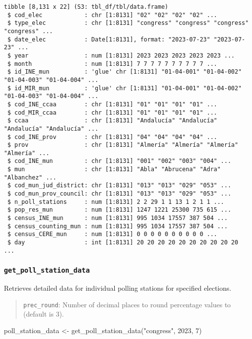 \documentclass[
  letterpaper,
  DIV=11,
  numbers=noendperiod]{scrreprt}
\newenvironment{Shaded}{\begin{snugshade}}{\end{snugshade}}
\newcommand{\DecValTok}[1]{\textcolor[rgb]{0.68,0.00,0.00}{#1}}
\newcommand{\FunctionTok}[1]{\textcolor[rgb]{0.28,0.35,0.67}{#1}}
\newcommand{\NormalTok}[1]{\textcolor[rgb]{0.00,0.23,0.31}{#1}}
\newcommand{\OtherTok}[1]{\textcolor[rgb]{0.00,0.23,0.31}{#1}}
\newcommand{\StringTok}[1]{\textcolor[rgb]{0.13,0.47,0.30}{#1}}
\begin{document}
\begin{verbatim}
tibble [8,131 x 22] (S3: tbl_df/tbl/data.frame)
 $ cod_elec            : chr [1:8131] "02" "02" "02" "02" ...
 $ type_elec           : chr [1:8131] "congress" "congress" "congress" "congress" ...
 $ date_elec           : Date[1:8131], format: "2023-07-23" "2023-07-23" ...
 $ year                : num [1:8131] 2023 2023 2023 2023 2023 ...
 $ month               : num [1:8131] 7 7 7 7 7 7 7 7 7 7 ...
 $ id_INE_mun          : 'glue' chr [1:8131] "01-04-001" "01-04-002" "01-04-003" "01-04-004" ...
 $ id_MIR_mun          : 'glue' chr [1:8131] "01-04-001" "01-04-002" "01-04-003" "01-04-004" ...
 $ cod_INE_ccaa        : chr [1:8131] "01" "01" "01" "01" ...
 $ cod_MIR_ccaa        : chr [1:8131] "01" "01" "01" "01" ...
 $ ccaa                : chr [1:8131] "Andalucía" "Andalucía" "Andalucía" "Andalucía" ...
 $ cod_INE_prov        : chr [1:8131] "04" "04" "04" "04" ...
 $ prov                : chr [1:8131] "Almería" "Almería" "Almería" "Almería" ...
 $ cod_INE_mun         : chr [1:8131] "001" "002" "003" "004" ...
 $ mun                 : chr [1:8131] "Abla" "Abrucena" "Adra" "Albanchez" ...
 $ cod_mun_jud_district: chr [1:8131] "013" "013" "029" "053" ...
 $ cod_mun_prov_council: chr [1:8131] "013" "013" "029" "053" ...
 $ n_poll_stations     : num [1:8131] 2 2 29 1 1 13 1 2 1 1 ...
 $ pop_res_mun         : num [1:8131] 1247 1221 25300 735 615 ...
 $ census_INE_mun      : num [1:8131] 995 1034 17557 387 504 ...
 $ census_counting_mun : num [1:8131] 995 1034 17557 387 504 ...
 $ census_CERE_mun     : num [1:8131] 0 0 0 0 0 0 0 0 0 0 ...
 $ day                 : int [1:8131] 20 20 20 20 20 20 20 20 20 20 ...
\end{verbatim}

\hypertarget{get_poll_station_data}{%
\subsubsection{\texorpdfstring{\texttt{get\_poll\_station\_data}}{get\_poll\_station\_data}}\label{get_poll_station_data}}

Retrieves detailed data for individual polling stations for specified
elections.

\begin{quote}
\texttt{prec\_round}: Number of decimal places to round percentage
values to (default is 3).
\end{quote}

\begin{Shaded}
\begin{Highlighting}[]
\NormalTok{poll\_station\_data }\OtherTok{\textless{}{-}} \FunctionTok{get\_poll\_station\_data}\NormalTok{(}\StringTok{"congress"}\NormalTok{, }\DecValTok{2023}\NormalTok{, }\DecValTok{7}\NormalTok{)}
\end{Highlighting}
\end{Shaded}
\end{document}
